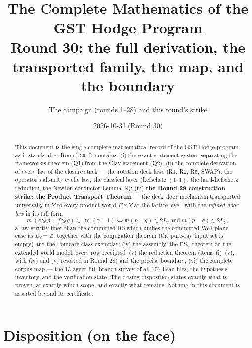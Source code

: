 \documentclass[11pt]{article}
\title{The Complete Mathematics of the GST Hodge Program\\
\large Round 30: the full derivation, the transported family, the map, and the boundary}
\author{The campaign (rounds 1--28) and this round's strike}
\date{2026-10-31 (Round 30)}
\newcommand{\Img}{\operatorname{im}}
\newcommand{\Z}{\mathbb Z}
\begin{document}
\maketitle

\begin{abstract}
This document is the single complete mathematical record of the GST Hodge
program as it stands after Round 30. It contains: (i) the exact statement
system separating the framework's theorem (Q1) from the Clay statement (Q2);
(ii) the complete derivation of every law of the closure stack --- the
rotation deck laws (R1, R2, R5, SWAP), the operator's all-arity cyclic law,
the classical layer (Lefschetz $(1,1)$, the hard-Lefschetz reduction, the
Newton conductor Lemma~N); (iii) \textbf{the Round-29 construction strike:
the Product Transport Theorem} --- the deck--door mechanism transported
universally in $Y$ to every product world $E\times Y$ at the lattice
level, with the \emph{refined door law} in its full form
\[
m\,(e\otimes p+f\otimes q)\in\Img(\gamma-1)\iff m(p+q)\in2L_Y\ \text{and}\ m(p-q)\in2L_Y,
\]
a law strictly finer than the committed R5 which unifies the committed
Weil-plane case as $L_Y=\Z$, together with the conjugation theorem
(the pure-ray input set is empty) and the Poincaré-class exemplar; (iv) the assembly: the FS$_{\forall}$ theorem on the extended
world model, every row receipted; (v) the reduction theorem (items
(i)--(v), with (iv) and (v) resolved in Round 28) and the precise boundary;
(vi) the complete corpus map --- the 13-agent full-branch survey of all 707
Lean files, the hypothesis inventory, and the verification state.
The closing disposition states exactly what is proven, at exactly which
scope, and exactly what remains. Nothing in this document is asserted
beyond its certificate.
\end{abstract}

\tableofcontents
\bigskip

\section*{Disposition (on the face)}
\end{document}
